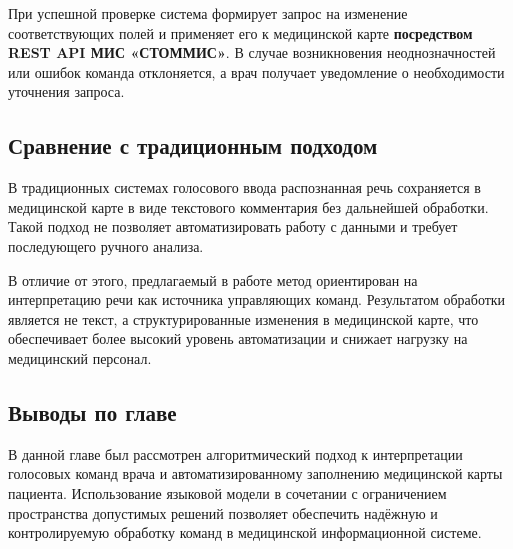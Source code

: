 При успешной проверке система формирует запрос на изменение соответствующих полей и применяет его к медицинской карте \textbf{посредством REST API МИС «СТОММИС»}. В случае возникновения неоднозначностей или ошибок команда отклоняется, а врач получает уведомление о необходимости уточнения запроса.

\subsection{Сравнение с традиционным подходом}

В традиционных системах голосового ввода распознанная речь сохраняется в медицинской карте в виде текстового комментария без дальнейшей обработки. Такой подход не позволяет автоматизировать работу с данными и требует последующего ручного анализа.

В отличие от этого, предлагаемый в работе метод ориентирован на интерпретацию речи как источника управляющих команд. Результатом обработки является не текст, а структурированные изменения в медицинской карте, что обеспечивает более высокий уровень автоматизации и снижает нагрузку на медицинский персонал.

\subsection{Выводы по главе}

В данной главе был рассмотрен алгоритмический подход к интерпретации голосовых команд врача и автоматизированному заполнению медицинской карты пациента. Использование языковой модели в сочетании с ограничением пространства допустимых решений позволяет обеспечить надёжную и контролируемую обработку команд в медицинской информационной системе.
